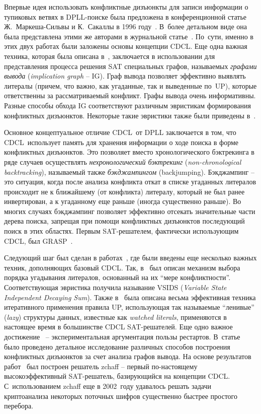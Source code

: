 Впервые идея использовать конфликтные дизъюнкты для записи информации о тупиковых ветвях в DPLL-поиске была предложена в конференционной статье Ж.~Маркеша-Сильвы и К.~Сакаллы в 1996 году~\cite{grasp}.
В~более детальном виде она была представлена этими же авторами в журнальной статье~\cite{marques-silva1999}.
По~сути, именно в этих двух работах были заложены основы концепции CDCL.
Еще одна важная техника, которая была описана в~\cite{grasp,marques-silva1999}, заключается в использовании для представления процесса решения SAT специальных графов, называемых \textit{графами вывода} (\textit{implication graph} \--- IG).
Граф вывода позволяет эффективно выявлять литералы (причем, что важно, как угаданные, так и выведенные по~UP), которые ответственны за рассматриваемый конфликт.
Графы вывода очень информативны.
Разные способы обхода IG соответствуют различным эвристикам формирования конфликтных дизъюнктов. Некоторые такие эвристики также были приведены в~\cite{grasp,marques-silva1999}.

Основное концептуальное отличие CDCL~от DPLL заключается в том, что CDCL~использует память для хранения информации о ходе поиска в форме конфликтных дизъюнктов.
Это позволяет вместо хронологического бэктрекинга в ряде случаев осуществлять \textit{нехронологический бэктрекинг} (\textit{non-chronological backtracking}), называемый также \textit{бэкджампингом} (backjumping).
Бэкджампинг \--- это ситуация, когда после анализа конфликта откат в списке угаданных литералов происходит не к ближайшему (от конфликта) литералу, который не был ранее инвертирован, а к угаданному еще раньше (иногда существенно раньше).
Во многих случаях бэкджампинг позволяет эффективно отсекать значительные части дерева поиска, запрещая при помощи конфликтных дизъюнктов последующий поиск в этих областях.
Первым SAT-решателем, фактически использующим CDCL, был GRASP~\cite{grasp}.

Следующий шаг был сделан в работах~\cite{moskewicz2001,zhang2001}, где были введены еще несколько важных техник, дополняющих базовый CDCL.
Так, в~\cite{moskewicz2001} был описан механизм выбора порядка угадывания литералов, основанный на их \enquote{мере конфликтности}.
Соответствующая эвристика получила называние VSIDS (\textit{Variable State Independent Decaying Sum}).
Также в~\cite{moskewicz2001} была описана весьма эффективная техника итеративного применения правила UP, использующая так называемые \enquote{ленивые} (\textit{lazy}) структуры данных, известные как \textit{watched literals}, применяются в настоящее время в большинстве CDCL SAT-решателей.
Еще одно важное достижение~\cite{moskewicz2001} \--- экспериментальная аргументация пользы рестартов.
В~статье~\cite{zhang2001} было проведено детальное исследование различных способов построения конфликтных дизъюнктов за счет анализа графов вывода.
На основе результатов работ~\cite{moskewicz2001,zhang2001} был построен решатель zchaff \--- первый по-настоящему высокоэффективный SAT-решатель, базирующийся на концепции CDCL.
С~использованием zchaff еще в 2002~году удавалось решать задачи криптоанализа некоторых поточных шифров существенно быстрее простого перебора.

